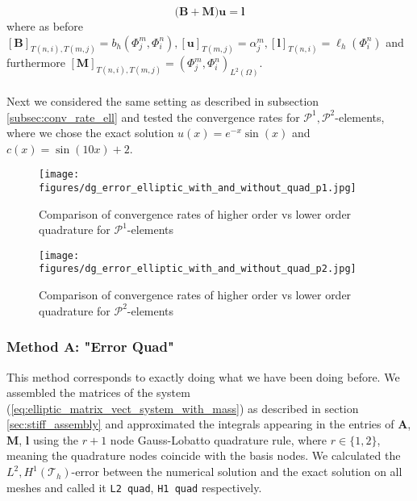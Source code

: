 \begin{equation}
	\label{eq:elliptic_matrix_vect_system_with_mass}
	\Big( \textbf{B} + \textbf{M} \Big) \textbf{u} = \textbf{l}
\end{equation}
where as before 
$ [\textbf{B}]_{T(n,i), T(m,j)} = b_h(\Phi_j^m, \Phi_i^n),
	[\textbf{u}]_{T(m,j)} = \alpha_j^m,
	[\textbf{l}]_{T(n,i)} = \ell_h(\Phi_i^n)$ and furthermore
$ [\textbf{M}]_{T(n,i), T(m,j)} = (\Phi_j^m, \Phi_i^n)_{L^2(\Omega)}$.
\\ \\
Next we considered the same setting as described in subsection \ref{subsec:conv_rate_ell} and tested the convergence rates for $\mathcal{P}^1,\mathcal{P}^2$-elements,
where we chose the exact solution $u(x) = e^{-x}\sin(x)$ and $c(x) = \sin(10x) + 2$.

\begin{figure}[h!]
    \centering
    
    \begin{minipage}[t]{0.48\textwidth}
        \centering
        \texttt{[image: figures/dg\_error\_elliptic\_with\_and\_without\_quad\_p1.jpg]}
        \caption{Comparison of convergence rates of higher order vs lower order quadrature for $\mathcal{P}^1$-elements}
        \label{fig:elliptic_with_and_without_quad_conv_rates_p1}
    \end{minipage}
    \hfill
    \begin{minipage}[t]{0.48\textwidth}
        \centering
        \texttt{[image: figures/dg\_error\_elliptic\_with\_and\_without\_quad\_p2.jpg]}
        \caption{Comparison of convergence rates of higher order vs lower order quadrature for $\mathcal{P}^2$-elements}
        \label{fig:elliptic_with_and_without_quad_conv_rates_p2}
    \end{minipage}
\end{figure}

\subsubsection*{Method A: "Error Quad"}
This method corresponds to exactly doing what we have been doing before. We assembled the matrices of the system (\ref{eq:elliptic_matrix_vect_system_with_mass})
as described in section \ref{sec:stiff_assembly} and approximated the integrals appearing in the entries of \textbf{A}, \textbf{M}, \textbf{l} 
using the $r+1$ node Gauss-Lobatto quadrature rule, where $r \in \{1,2\}$, meaning the quadrature nodes coincide with the basis nodes.
We calculated the $L^2, H^1(\mathcal{T}_h)$-error between the numerical solution and the exact solution on all meshes and called it \texttt{L2 quad}, \texttt{H1 quad}
respectively.

